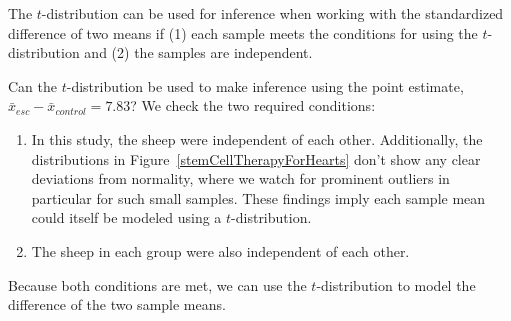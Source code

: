 {%

\begin{termBox}{
\label{ConditionsForTwoSampleTDist}The $t$-distribution can be used for inference when working with the standardized difference of two means if (1) each sample meets the conditions for using the $t$-distribution and (2) the samples are independent.}
\end{termBox}

\begin{example}{Can the $t$-distribution be used to make inference using the point estimate, $\bar{x}_{esc} - \bar{x}_{control} = 7.83$?}
We check the two required conditions:
\begin{enumerate}
\item In this study, the sheep were independent of each other. Additionally, the distributions in Figure~\ref{stemCellTherapyForHearts} don't show any clear deviations from normality, where we watch for prominent outliers in particular for such small samples. These findings imply each sample mean could itself be modeled using a $t$-distribution.
\item The sheep in each group were also independent of each other.
\end{enumerate}
Because both conditions are met, we can use the $t$-distribution to model the difference of the two sample means.
\end{example}

}
